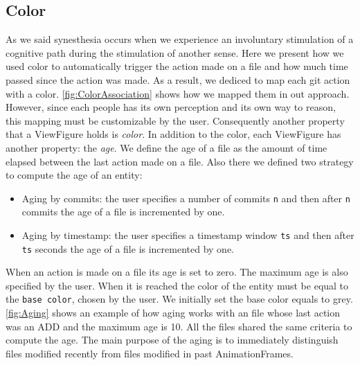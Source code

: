 \subsection*{Color}

As we said synesthesia occurs when we experience an involuntary stimulation of a cognitive path during the stimulation of another sense. Here we present how we used color to automatically trigger the action made on a file and how much time passed since the action was made. 
As a result, we dediced to map each git action with a color. \autoref{fig:ColorAssociation} shows how we mapped them in out approach. However, since each people has its own perception and its own way to reason, this mapping must be customizable by the user. Consequently another property that a ViewFigure holds is \textit{color}.
\bigbreak
In addition to the color, each ViewFigure has another property: the \textit{age}. We define the age of a file as the amount of time elapsed between the last action made on a file. Also there we defined two strategy to compute the age of an entity:

\begin{itemize}
    \item{Aging by commits}: the user specifies a number of commits \texttt{n} and then after \texttt{n} commits the age of a file is incremented by one. 
    \item{Aging by timestamp}:  the user specifies a timestamp window \texttt{ts} and then after \texttt{ts} seconds the age of a file is incremented by one.
\end{itemize}

When an action is made on a file its age is set to zero. 
\bigbreak
The maximum age is also specified by the user. When it is reached the color of the entity must be equal to the \texttt{base color}, chosen by the user. 
We initially set the base color equals to grey. \autoref{fig:Aging} shows an example of how aging works with an file whose last action was an ADD and the maximum age is 10. 
\bigbreak
All the files shared the same criteria to compute the age. The main purpose of the aging is to immediately distinguish files modified recently from files modified in past AnimationFrames.

